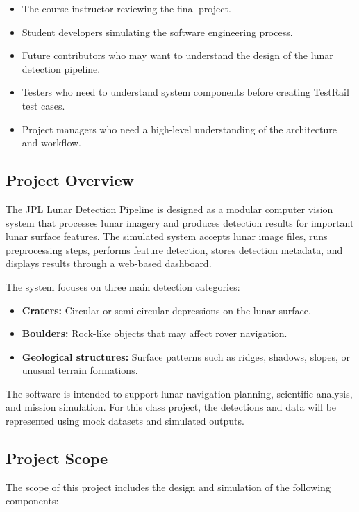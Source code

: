 \documentclass[12pt]{article}
\begin{document}
\begin{itemize}
    \item The course instructor reviewing the final project.
    \item Student developers simulating the software engineering process.
    \item Future contributors who may want to understand the design of the lunar detection pipeline.
    \item Testers who need to understand system components before creating TestRail test cases.
    \item Project managers who need a high-level understanding of the architecture and workflow.
\end{itemize}

\subsection{Project Overview}

The JPL Lunar Detection Pipeline is designed as a modular computer vision system that processes lunar imagery and produces detection results for important lunar surface features. The simulated system accepts lunar image files, runs preprocessing steps, performs feature detection, stores detection metadata, and displays results through a web-based dashboard.

The system focuses on three main detection categories:

\begin{itemize}
    \item \textbf{Craters:} Circular or semi-circular depressions on the lunar surface.
    \item \textbf{Boulders:} Rock-like objects that may affect rover navigation.
    \item \textbf{Geological structures:} Surface patterns such as ridges, shadows, slopes, or unusual terrain formations.
\end{itemize}

The software is intended to support lunar navigation planning, scientific analysis, and mission simulation. For this class project, the detections and data will be represented using mock datasets and simulated outputs.

\subsection{Project Scope}

The scope of this project includes the design and simulation of the following components:
\end{document}
